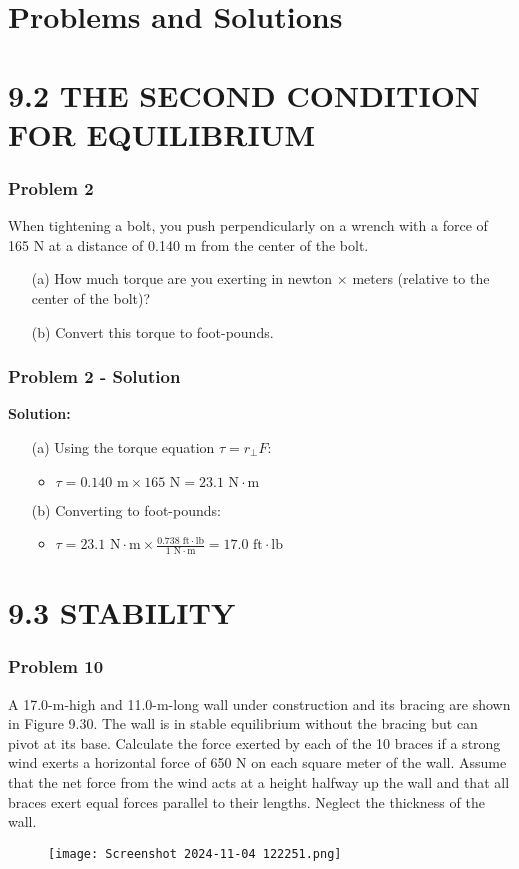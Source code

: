 \documentclass{beamer}
\begin{document}
\section{Problems and Solutions}

\section{9.2 THE SECOND CONDITION FOR EQUILIBRIUM}

\begin{frame}
\frametitle{Problem 2}
When tightening a bolt, you push perpendicularly on a wrench with a force of 165 N at a distance of 0.140 m from the center of the bolt.
\begin{itemize}
    \item[(a)] How much torque are you exerting in newton $\times$ meters (relative to the center of the bolt)?
    \item[(b)] Convert this torque to foot-pounds.
\end{itemize}
\end{frame}

\begin{frame}
\frametitle{Problem 2 - Solution}
\textbf{Solution:}
\begin{itemize}
    \item[(a)] Using the torque equation $\tau = r_\perp F$:
    \begin{itemize}
        \item $\tau = 0.140 \text{ m} \times 165 \text{ N} = 23.1 \text{ N} \cdot \text{m}$
    \end{itemize}
    \item[(b)] Converting to foot-pounds:
    \begin{itemize}
        \item $\tau = 23.1 \text{ N}\cdot\text{m} \times \frac{0.738 \text{ ft}\cdot\text{lb}}{1 \text{ N}\cdot\text{m}} = 17.0 \text{ ft}\cdot\text{lb}$
    \end{itemize}
\end{itemize}
\end{frame}

\section{9.3 STABILITY}

\begin{frame}
\frametitle{Problem 10}
A 17.0-m-high and 11.0-m-long wall under construction and its bracing are shown in Figure 9.30. The wall is in stable equilibrium without the bracing but can pivot at its base. Calculate the force exerted by each of the 10 braces if a strong wind exerts a horizontal force of 650 N on each square meter of the wall. Assume that the net force from the wind acts at a height halfway up the wall and that all braces exert equal forces parallel to their lengths. Neglect the thickness of the wall.
\begin{figure}[H]
    \centering
    \texttt{[image: Screenshot 2024-11-04 122251.png]}
\end{figure}

\end{frame}
\end{document}
